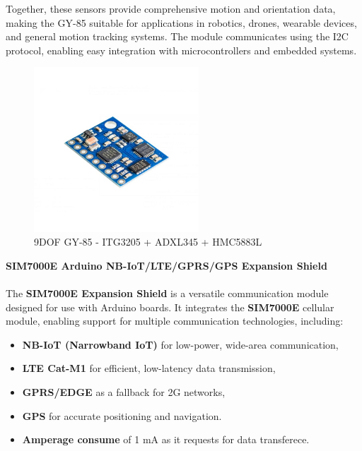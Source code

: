 Together, these sensors provide comprehensive motion and orientation data, 
making the GY-85 suitable for applications in robotics, drones, wearable 
devices, and general motion tracking systems. The module communicates using 
the I2C protocol, enabling easy integration with microcontrollers and 
embedded systems.

\begin{figure}[H]
    \centering
    \includegraphics[width=0.55\textwidth]{images/chapter/design/components/final_IMU.png}  %
    \caption{9DOF GY-85 - ITG3205 + ADXL345 + HMC5883L}
    \label{fig:9DOF GY-85 - ITG3205 + ADXL345 + HMC5883L}        
\end{figure}

\textbf{SIM7000E Arduino NB-IoT/LTE/GPRS/GPS Expansion Shield}
\\\\
The \textbf{SIM7000E Expansion Shield} is a versatile communication module designed for use with Arduino boards. It integrates the \textbf{SIM7000E} cellular module, enabling support for multiple communication technologies, including:

\begin{itemize}
    \item \textbf{NB-IoT (Narrowband IoT)} for low-power, wide-area communication,
    \item \textbf{LTE Cat-M1} for efficient, low-latency data transmission,
    \item \textbf{GPRS/EDGE} as a fallback for 2G networks,
    \item \textbf{GPS} for accurate positioning and navigation.
    \item \textbf{Amperage consume} of 1 mA as it requests for data transferece.
\end{itemize}


